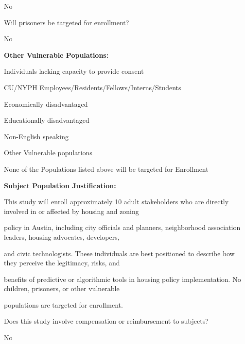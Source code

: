 \documentclass[10pt, letterpaper]{article}
\begin{document}
No

Will prisoners be targeted for enrollment?

No

\noindent \textbf{Other Vulnerable Populations:}

\noindent \makebox[0pt][l]{$\square$}\hspace{1.2em}Individuals lacking capacity to provide consent

\noindent \makebox[0pt][l]{$\square$}\hspace{1.2em}CU/NYPH Employees/Residents/Fellows/Interns/Students

\noindent \makebox[0pt][l]{$\square$}\hspace{1.2em}Economically disadvantaged

\noindent \makebox[0pt][l]{$\square$}\hspace{1.2em}Educationally disadvantaged

\noindent \makebox[0pt][l]{$\square$}\hspace{1.2em}Non-English speaking

\noindent \makebox[0pt][l]{$\square$}\hspace{1.2em}Other Vulnerable populations

\noindent \makebox[0pt][l]{\color{columbiablue_official}$\boxtimes$}\hspace{1.2em}None of the Populations listed above will be targeted for Enrollment

\noindent \textbf{Subject Population Justification:}

This study will enroll approximately 10 adult stakeholders who are directly involved in or affected by housing and zoning

policy in Austin, including city officials and planners, neighborhood association leaders, housing advocates, developers,

and civic technologists. These individuals are best positioned to describe how they perceive the legitimacy, risks, and

benefits of predictive or algorithmic tools in housing policy implementation. No children, prisoners, or other vulnerable

populations are targeted for enrollment.

Does this study involve compensation or reimbursement to subjects?

No

\vspace{0.5em}

\vspace{0.5em}
\end{document}
